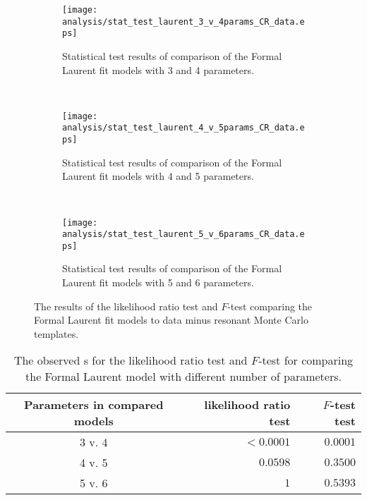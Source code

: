 \begin{figure}[htbp]
 \centering
 \begin{subfigure}[t]{0.333\textwidth}
  \centering
  \texttt{[image: analysis/stat\_test\_laurent\_3\_v\_4params\_CR\_data.eps]}
  \caption[Comparison of the Formal Laurent fit models with 3 and 4 parameters.]{%
   Statistical test results of comparison of the Formal Laurent fit models with 3 and 4 parameters.}
  \label{fig:stat_test_laurent_3_v_4params_CR_data}
 \end{subfigure}%
 ~
 \begin{subfigure}[t]{0.333\textwidth}
  \centering
  \texttt{[image: analysis/stat\_test\_laurent\_4\_v\_5params\_CR\_data.eps]}
  \caption[Comparison of the Formal Laurent fit models with 4 and 5 parameters.]{%
   Statistical test results of comparison of the Formal Laurent fit models with 4 and 5 parameters.}
  \label{fig:stat_test_laurent_4_v_5params_CR_data}
 \end{subfigure}%
 ~
 \begin{subfigure}[t]{0.333\textwidth}
  \centering
  \texttt{[image: analysis/stat\_test\_laurent\_5\_v\_6params\_CR\_data.eps]}
  \caption[Comparison of the Formal Laurent fit models with 5 and 6 parameters.]{%
   Statistical test results of comparison of the Formal Laurent fit models with 5 and 6 parameters.}
  \label{fig:stat_test_laurent_5_v_6params_CR_data}
 \end{subfigure}%
 \caption[The results of the likelihood ratio test and $F$-test comparing the Formal Laurent fit models to \CRQCD{} data minus resonant Monte Carlo templates.]{%
  The results of the likelihood ratio test and $F$-test comparing the Formal Laurent fit models to \CRQCD{} data minus resonant Monte Carlo templates.}
 \label{fig:likelihood_ratio_test_laurent}
\end{figure}

\begin{table}[htbp]
 \centering
 \caption{The observed \pvalue{}s for the likelihood ratio test and $F$-test for comparing the Formal Laurent model with different number of parameters.}
 \label{table:stat_test_parameters_laurent}
 \begin{tabular}{@{}crr@{}} \toprule
  Parameters in compared models & likelihood ratio test \pvalue{} & $F$-test test \pvalue{} \\ \midrule
  3 v. 4                        & $<0.0001$                       & $0.0001$                \\
  4 v. 5                        & $0.0598$                        & $0.3500$                \\
  5 v. 6                        & $1$                             & $0.5393$                \\
  \bottomrule
 \end{tabular}
\end{table}

